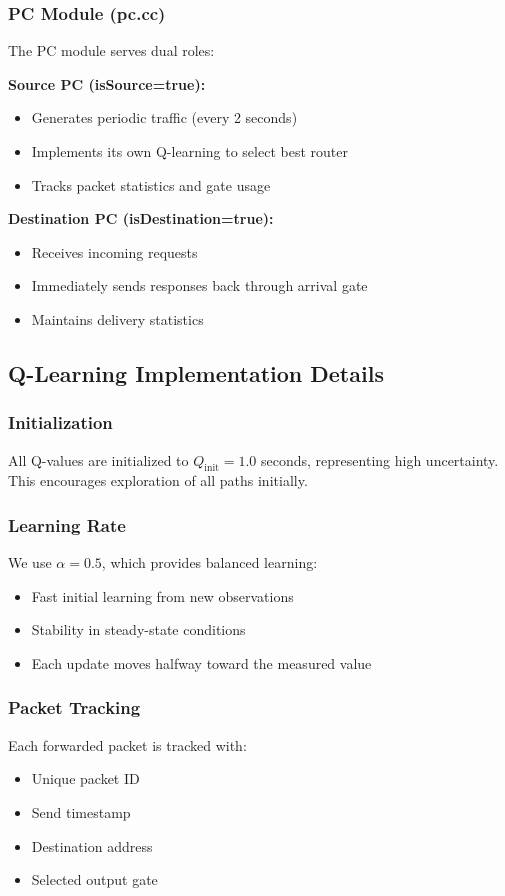 \documentclass[12pt,a4paper]{article}
\begin{document}
\subsubsection{PC Module (pc.cc)}

The PC module serves dual roles:

\textbf{Source PC (isSource=true):}
\begin{itemize}
    \item Generates periodic traffic (every 2 seconds)
    \item Implements its own Q-learning to select best router
    \item Tracks packet statistics and gate usage
\end{itemize}

\textbf{Destination PC (isDestination=true):}
\begin{itemize}
    \item Receives incoming requests
    \item Immediately sends responses back through arrival gate
    \item Maintains delivery statistics
\end{itemize}

\subsection{Q-Learning Implementation Details}

\subsubsection{Initialization}
All Q-values are initialized to $Q_{\text{init}} = 1.0$ seconds, representing high uncertainty. This encourages exploration of all paths initially.

\subsubsection{Learning Rate}
We use $\alpha = 0.5$, which provides balanced learning:
\begin{itemize}
    \item Fast initial learning from new observations
    \item Stability in steady-state conditions
    \item Each update moves halfway toward the measured value
\end{itemize}

\subsubsection{Packet Tracking}
Each forwarded packet is tracked with:
\begin{itemize}
    \item Unique packet ID
    \item Send timestamp
    \item Destination address
    \item Selected output gate
\end{itemize}
\end{document}
